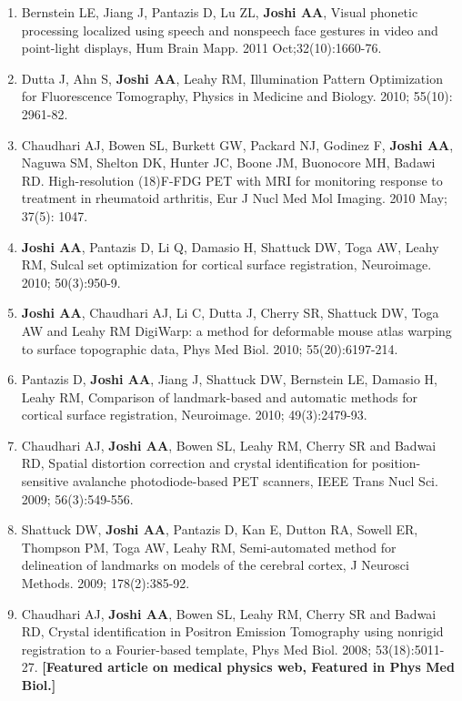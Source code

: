 \documentclass[overlapped,line,letterpaper]{res}
\begin{document}
\begin{resume}
\begin{enumerate}
    \item Bernstein LE, Jiang J, Pantazis D, Lu ZL, \textbf{Joshi AA}, {Visual phonetic processing localized using speech and nonspeech face gestures in video and point-light displays}, Hum Brain Mapp. 2011 Oct;32(10):1660-76.

    \item Dutta J, Ahn S, \textbf{Joshi AA}, Leahy RM, {Illumination Pattern Optimization for Fluorescence Tomography}, Physics in Medicine and Biology. 2010; 55(10): 2961-82.

    \item Chaudhari AJ, Bowen SL, Burkett GW, Packard NJ, Godinez F, \textbf{Joshi AA}, Naguwa SM, Shelton DK, Hunter JC, Boone JM, Buonocore MH, Badawi RD. {High-resolution (18)F-FDG PET with MRI for monitoring response to treatment in rheumatoid arthritis}, Eur J Nucl Med Mol Imaging. 2010 May; 37(5): 1047.

    \item \textbf{Joshi AA}, Pantazis D, Li Q, Damasio H, Shattuck DW, Toga AW, Leahy RM, {Sulcal set optimization for cortical surface registration}, Neuroimage. 2010; 50(3):950-9.

    \item \textbf{Joshi AA}, Chaudhari AJ,  Li C, Dutta J, Cherry SR, Shattuck DW, Toga AW and Leahy RM {DigiWarp: a method for deformable mouse atlas warping to surface topographic data}, Phys Med Biol. 2010; 55(20):6197-214.

    \item Pantazis D, \textbf{Joshi AA}, Jiang J, Shattuck DW, Bernstein LE, Damasio H, Leahy RM, {Comparison of landmark-based and automatic methods for cortical surface registration}, Neuroimage. 2010; 49(3):2479-93.

    \item Chaudhari AJ, \textbf{Joshi AA}, Bowen SL, Leahy RM, Cherry SR and Badwai RD, {Spatial distortion correction and crystal identification for position-sensitive avalanche photodiode-based PET scanners}, IEEE Trans Nucl Sci. 2009; 56(3):549-556.

    \item Shattuck DW, \textbf{Joshi AA}, Pantazis D, Kan E, Dutton RA, Sowell ER, Thompson PM, Toga AW, Leahy RM, {Semi-automated method for delineation of landmarks on models of the cerebral cortex}, J Neurosci Methods. 2009; 178(2):385-92.

    \item Chaudhari AJ, \textbf{Joshi AA}, Bowen SL, Leahy RM, Cherry SR and Badwai RD, {Crystal identification in Positron Emission Tomography using nonrigid registration to a Fourier-based template}, Phys Med Biol. 2008; 53(18):5011-27. \textbf{[Featured article on medical physics web, Featured in Phys Med Biol.]}


\end{enumerate}
\end{resume}
\end{document}
